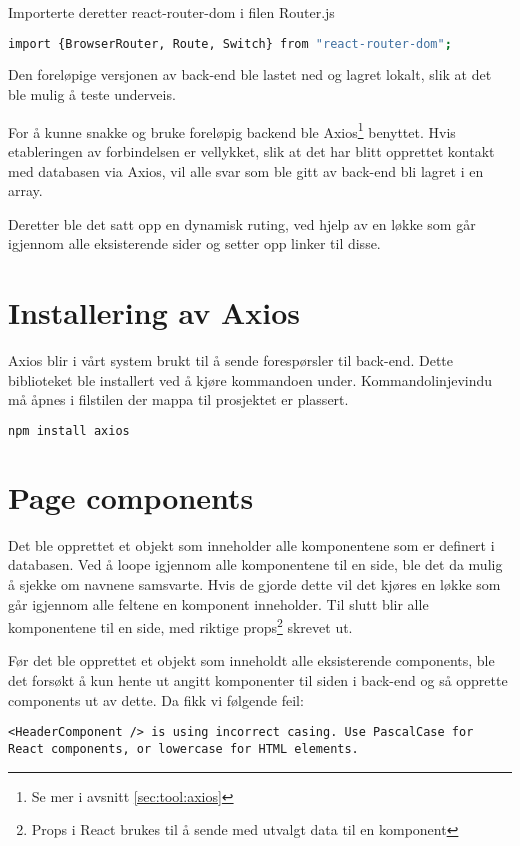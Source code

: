 Importerte deretter react-router-dom i filen Router.js

\begin{lstlisting}[caption={Importering av react-router-dom},language=bash]
import {BrowserRouter, Route, Switch} from "react-router-dom";
\end{lstlisting}

Den foreløpige versjonen av back-end ble lastet ned og lagret lokalt, slik at det ble mulig å teste underveis.

For å kunne snakke og bruke foreløpig backend ble Axios\footnote{Se mer i avsnitt \ref{sec:tool:axios}} benyttet. Hvis etableringen av forbindelsen er vellykket, slik at det har blitt opprettet kontakt med databasen via Axios, vil alle svar som ble gitt av back-end bli lagret i en array. 

Deretter ble det satt opp en dynamisk ruting, ved hjelp av en løkke som går igjennom alle eksisterende sider og setter opp linker til disse.

\section{Installering av Axios}
Axios blir i vårt system brukt til å sende forespørsler til back-end. Dette biblioteket ble installert ved å kjøre kommandoen under.  Kommandolinjevindu må åpnes i filstilen der mappa til prosjektet er plassert.
\begin{lstlisting}[caption={Installering av Axios},language=bash]
npm install axios
\end{lstlisting}


\section{Page components}

Det ble opprettet et objekt som inneholder alle komponentene som er definert i databasen. Ved å loope igjennom alle komponentene til en side, ble det da mulig å sjekke om navnene samsvarte. Hvis de gjorde dette vil det kjøres en løkke som går igjennom alle feltene en komponent inneholder. Til slutt blir alle komponentene til en side, med riktige props\footnote{Props i React brukes til å sende med utvalgt data til en komponent} skrevet ut.  

Før det ble opprettet et objekt som inneholdt alle eksisterende components, ble det forsøkt å kun hente ut angitt komponenter til siden i back-end og så opprette components ut av dette. Da fikk vi følgende feil:
\begin{lstlisting}
<HeaderComponent /> is using incorrect casing. Use PascalCase for React components, or lowercase for HTML elements.
\end{lstlisting}

